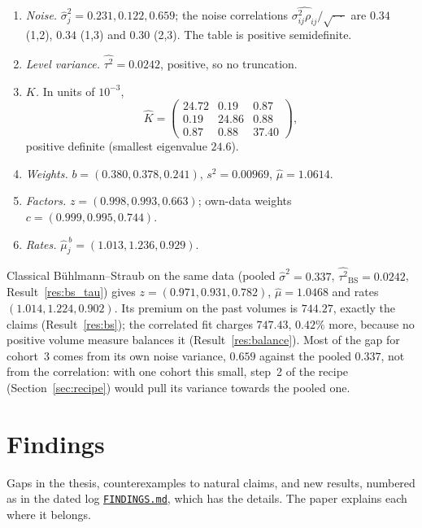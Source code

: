 \documentclass[11pt]{article}
\theoremstyle{remark}
\newcommand{\hmu}{\hat\mu}
\begin{document}
\begin{enumerate}
  \item \emph{Noise.} $\hat\sigma_j^2 = 0.231, 0.122, 0.659$; the noise correlations
    $\widehat{\sigma^2_{ij}\rho_{ij}}/\sqrt{\cdot\,\cdot}$ are $0.34$ (1,2), $0.34$ (1,3) and
    $0.30$ (2,3). The table is positive semidefinite.
  \item \emph{Level variance.} $\widehat{\tau^2} = 0.0242$, positive, so no truncation.
  \item \emph{$K$.} In units of $10^{-3}$,
    \[
      \hat K = \begin{pmatrix} 24.72 & 0.19 & 0.87 \\ 0.19 & 24.86 & 0.88 \\ 0.87 & 0.88 & 37.40 \end{pmatrix},
    \]
    positive definite (smallest eigenvalue $24.6$).
  \item \emph{Weights.} $b = (0.380, 0.378, 0.241)$, $s^2 = 0.00969$, $\hmu = 1.0614$.
  \item \emph{Factors.} $z = (0.998, 0.993, 0.663)$; own-data weights $c = (0.999, 0.995, 0.744)$.
  \item \emph{Rates.} $\hmu_j^{\,b} = (1.013, 1.236, 0.929)$.
\end{enumerate}
Classical Bühlmann--Straub on the same data (pooled $\hat\sigma^2 = 0.337$,
$\widehat{\tau^2}_{\mathrm{BS}} = 0.0242$, Result~\ref{res:bs_tau}) gives $z = (0.971, 0.931, 0.782)$,
$\hmu = 1.0468$ and rates $(1.014, 1.224, 0.902)$. Its premium on the past volumes is $744.27$,
exactly the claims (Result~\ref{res:bs}); the correlated fit charges $747.43$, $0.42\%$ more,
because no positive volume measure balances it (Result~\ref{res:balance}). Most of the gap for
cohort~3 comes from its own noise variance, $0.659$ against the pooled $0.337$, not from the
correlation: with one cohort this small, step~2 of the recipe (Section~\ref{sec:recipe}) would
pull its variance towards the pooled one.

\section{Findings}\label{sec:findings}

Gaps in the thesis, counterexamples to natural claims, and new results, numbered as in the dated
log \href{https://github.com/mikaelandblom-coder/credible-lean/blob/main/FINDINGS.md}{\texttt{FINDINGS.md}},
which has the details. The paper explains each where it belongs.
\end{document}
